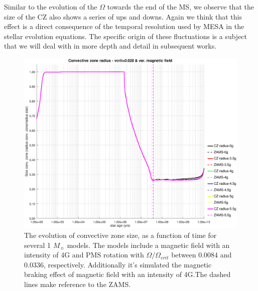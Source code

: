 \documentclass[fleqn,usenatbib]{mnras}
\begin{document}
Similar to the evolution of the $\Omega$ towards the end of the MS, we observe that the size of the CZ also shows a series of ups and downs. Again we think that this effect is a direct consequence of the temporal resolution used by MESA in the stellar evolution equations. The specific origin of these fluctuations is a subject that we will deal with in more depth and detail in subsequent works.\par

\begin{figure}
	\includegraphics[trim = 30mm 15mm 20mm 15mm, clip,width=\columnwidth]{figures/cz_vc_028_var_g.eps}
    \caption{The evolution of convective zone size, as a function of time for several 1 $M_{\sun}$ models. The models include a magnetic field with an intensity of 4G and PMS rotation with $\Omega / \Omega_{crit}$ between 0.0084 and 0.0336, respectively. Additionally it's simulated the magnetic braking effect of magnetic field with an intensity of 4G.The dashed lines make reference to the ZAMS.}
    \label{fig:cz_vc_028_var_b}
\end{figure}
\end{document}
